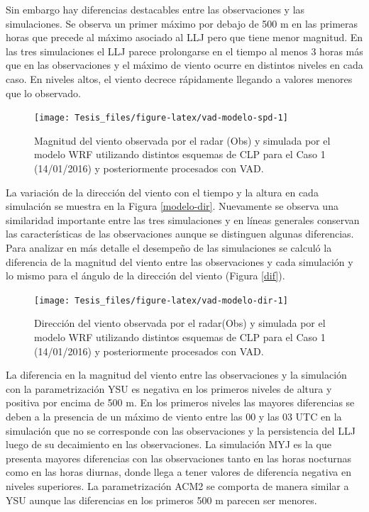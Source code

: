 \documentclass[12pt,spanish,oneside, a4paper]{book}
\begin{document}
Sin embargo hay diferencias destacables entre las observaciones y las
simulaciones. Se observa un primer máximo por debajo de 500 m en las
primeras horas que precede al máximo asociado al LLJ pero que tiene
menor magnitud. En las tres simulaciones el LLJ parece prolongarse en el
tiempo al menos 3 horas más que en las observaciones y el máximo de
viento ocurre en distintos niveles en cada caso. En niveles altos, el
viento decrece rápidamente llegando a valores menores que lo observado.

\begin{figure}

{\centering \texttt{[image: Tesis\_files/figure-latex/vad-modelo-spd-1]} 

}

\caption{Magnitud del viento observada por el radar (Obs) y simulada por el modelo WRF utilizando distintos esquemas de CLP para el Caso 1 (14/01/2016) y posteriormente procesados con VAD. \label{modelo-spd}}\label{fig:vad-modelo-spd}
\end{figure}

La variación de la dirección del viento con el tiempo y la altura en
cada simulación se muestra en la Figura \ref{modelo-dir}. Nuevamente se
observa una similaridad importante entre las tres simulaciones y en
líneas generales conservan las características de las observaciones
aunque se distinguen algunas diferencias. Para analizar en más detalle
el desempeño de las simulaciones se calculó la diferencia de la magnitud
del viento entre las observaciones y cada simulación y lo mismo para el
ángulo de la dirección del viento (Figura \ref{dif}).

\begin{figure}

{\centering \texttt{[image: Tesis\_files/figure-latex/vad-modelo-dir-1]} 

}

\caption{Dirección del viento observada por el radar(Obs) y simulada por el modelo WRF utilizando distintos esquemas de CLP para el Caso 1 (14/01/2016) y posteriormente procesados con VAD. \label{modelo-dir}}\label{fig:vad-modelo-dir}
\end{figure}

La diferencia en la magnitud del viento entre las observaciones y la
simulación con la parametrización YSU es negativa en los primeros
niveles de altura y positiva por encima de 500 m. En los primeros
niveles las mayores diferencias se deben a la presencia de un máximo de
viento entre las 00 y las 03 UTC en la simulación que no se corresponde
con las observaciones y la persistencia del LLJ luego de su decaimiento
en las observaciones. La simulación MYJ es la que presenta mayores
diferencias con las observaciones tanto en las horas nocturnas como en
las horas diurnas, donde llega a tener valores de diferencia negativa en
niveles superiores. La parametrización ACM2 se comporta de manera
similar a YSU aunque las diferencias en los primeros 500 m parecen ser
menores.
\end{document}
